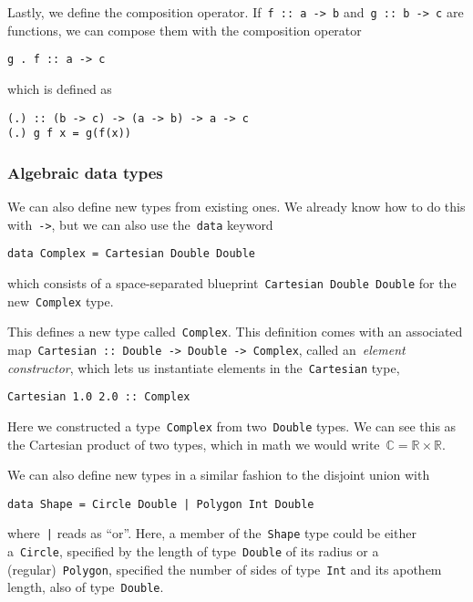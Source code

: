 \documentclass[../TFG.tex]{subfiles}
\begin{document}
Lastly, we define the composition operator. If~\texttt{f :: a -> b}
and~\texttt{g :: b -> c} are functions, we can compose them with
the composition operator
\begin{verbatim}
g . f :: a -> c
\end{verbatim}
which is defined as
\begin{verbatim}
(.) :: (b -> c) -> (a -> b) -> a -> c
(.) g f x = g(f(x))
\end{verbatim}

\subsubsection{Algebraic data types}
We can also define new types from existing ones. We already know how to do this
with~\texttt{->}, but we can also use
the~\texttt{data} keyword
\begin{verbatim}
data Complex = Cartesian Double Double
\end{verbatim}
which consists of a space-separated blueprint~\texttt{Cartesian
Double Double} for the new~\texttt{Complex} type.

This defines a new type called~\texttt{Complex}. This definition
comes with an associated
map~\texttt{Cartesian :: Double -> Double -> Complex}, called
an~\emph{element constructor}, which lets us instantiate elements in
the~\texttt{Cartesian} type, \ie
\begin{verbatim}
Cartesian 1.0 2.0 :: Complex
\end{verbatim}

Here we constructed a type~\texttt{Complex} from
two~\texttt{Double} types. We can see this as the Cartesian product
of two types, which in math we would
write~\(\mathbb{C}=\mathbb{R}\times\mathbb{R}\).

We can also define new types in a similar fashion to the disjoint union with
\begin{verbatim}
data Shape = Circle Double | Polygon Int Double
\end{verbatim}
where~\texttt{|} reads as ``or''. Here, a member of
the~\texttt{Shape} type could be either
a~\texttt{Circle}, specified by the length of
type~\texttt{Double} of its radius or a
(regular)~\texttt{Polygon}, specified the number of sides of
type~\texttt{Int} and its apothem length, also of
type~\texttt{Double}.
\end{document}

